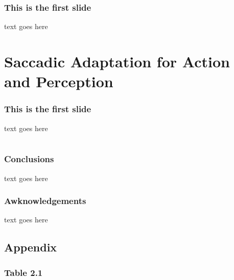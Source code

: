 \documentclass{beamer}
\begin{document}
 \begin{frame}
  \frametitle{This is the first slide}
  text goes here
 \end{frame}

\section[Saccadic Adaptation]{Saccadic Adaptation for Action and Perception} 

 \begin{frame}
  \frametitle{This is the first slide}
  text goes here
 \end{frame}

\section*{}
\begin{frame}
  \frametitle{Conclusions}
  text goes here
 \end{frame}

 \begin{frame}
  \frametitle{Awknowledgements}
  text goes here
 \end{frame}


\subsection*{Appendix}
\begin{frame}
  \frametitle{Table 2.1}
 \end{frame}


 
\end{document}
